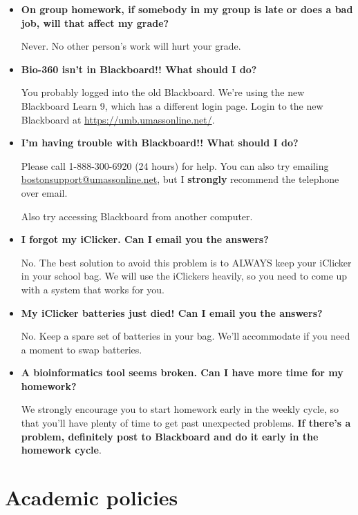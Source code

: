\documentclass[12pt]{article}
\begin{document}
\begin{itemize}
\item \textbf{On group homework, if somebody in my group is late or does a bad job, will that affect my grade?}

{Never.  No other person's work will hurt your grade.}

\item \textbf{Bio-360 isn't in Blackboard!!  What should I do?}

You probably logged into the old Blackboard.  We're using the new Blackboard
Learn 9, which has a different login page.  Login to the new Blackboard at
\url{https://umb.umassonline.net/}.


\item \textbf{I'm having trouble with Blackboard!!  What should I do?}

  Please call 1-888-300-6920 (24 hours) for help.  You can also try emailing
  \url{bostonsupport@umassonline.net}, but I \textbf{strongly}
  recommend the telephone over email.

  Also try accessing Blackboard from another computer.

\item \textbf{I forgot my iClicker.  Can I email you the answers?}

{No. The best solution to avoid this problem is to ALWAYS keep your iClicker in
  your school bag.  We will use the iClickers heavily, so you need to come up
  with a system that works for you.}


\item \textbf{My iClicker batteries just died!  Can I email you the answers?}

No. Keep a spare set of batteries in your bag.  We'll accommodate if you need a moment to swap batteries.

\item \textbf{A bioinformatics tool seems broken.  Can I have more time for my homework?}

We strongly encourage you to start homework early in the weekly cycle, so that you'll
have plenty of time to get past unexpected problems.  \textbf{If there's a
  problem, definitely post to Blackboard and do it early in the homework
  cycle}.


\end{itemize}


\section{Academic policies}
\label{sec:policies}
\end{document}
